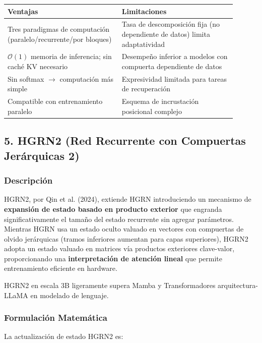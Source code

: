 \documentclass[11pt,a4paper]{article}
\begin{document}
\begin{table}[h]
\centering
\begin{tabular}{|p{0.45\linewidth}|p{0.45\linewidth}|}
\hline
\textbf{Ventajas} & \textbf{Limitaciones} \\
\hline
Tres paradigmas de computación (paralelo/recurrente/por bloques) & Tasa de descomposición fija (no dependiente de datos) limita adaptatividad \\
\hline
$\mathcal{O}(1)$ memoria de inferencia; sin caché KV necesario & Desempeño inferior a modelos con compuerta dependiente de datos \\
\hline
Sin softmax $\rightarrow$ computación más simple & Expresividad limitada para tareas de recuperación \\
\hline
Compatible con entrenamiento paralelo & Esquema de incrustación posicional complejo \\
\hline
\end{tabular}
\end{table}

\subsection{5. HGRN2 (Red Recurrente con Compuertas Jerárquicas 2)}

\subsubsection{Descripción}

HGRN2, por Qin et al. (2024), extiende HGRN introduciendo un mecanismo de \textbf{expansión de estado basado en producto exterior} que engranda significativamente el tamaño del estado recurrente sin agregar parámetros. Mientras HGRN usa un estado oculto valuado en vectores con compuertas de olvido jerárquicas (tramos inferiores aumentan para capas superiores), HGRN2 adopta un estado valuado en matrices vía productos exteriores clave-valor, proporcionando una \textbf{interpretación de atención lineal} que permite entrenamiento eficiente en hardware.

HGRN2 en escala 3B ligeramente supera Mamba y Transformadores arquitectura-LLaMA en modelado de lenguaje.

\subsubsection{Formulación Matemática}

La actualización de estado HGRN2 es:
\end{document}
